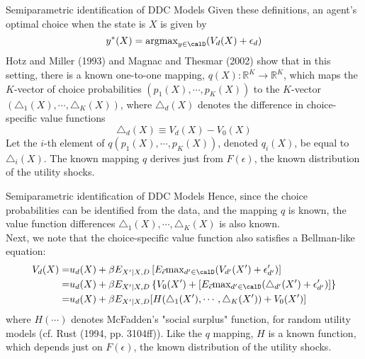 \begin{frame}{Semiparametric identification of DDC Models}
Given these definitions, an agent's optimal choice when the state is $X$ is given by 
\begin{equation*}
y^* (X) = \text{argmax}_{y \in \calD} (V_d(X) + \epsilon_d)
\end{equation*}
Hotz and Miller (1993) and Magnac and Thesmar (2002) show that in this setting, there is a known one-to-one mapping, $q(X) : \mathbb{R}^K \rightarrow \mathbb{R}^K$, which maps the $K$-vector of choice probabilities $(p_1(X), \cdots , p_K(X))$ to the $K$-vector $(\triangle_1(X), \cdots , \triangle_K (X))$, where $\triangle_d(X)$ denotes the difference in choice-specific value functions
\begin{equation*}
\triangle_d(X) \equiv V_d(X) - V_0(X)
\end{equation*}
Let the $i$-th element of $q(p_1(X), \cdots, p_K(X))$, denoted $q_i(X)$, be equal to $\triangle_i(X)$. The known mapping $q$ derives just from $F(\epsilon)$, the known distribution of the utility shocks. \\
\end{frame}

\begin{frame}{Semiparametric identification of DDC Models}
Hence, since the choice probabilities can be identified from the data, and the mapping $q$ is known, the value function differences $\triangle_1(X), \cdots, \triangle_K(X)$ is also known. \\
\vspace{2mm}
Next, we note that the choice-specific value function also satisfies a Bellman-like equation:
\begin{equation}
\begin{split}
V_d(X) = & u_d(X) + \beta E_{X'|X,D} \left [ E_{\vec{\epsilon}} \text{max}_{d' \in \calD} (V_{d'} (X') + \epsilon'_{d'}) \right ] \\
= & u_d(X) + \beta E_{X'|X,D} \left \{ V_0 (X') + \left [ E_{\vec{\epsilon}} \text{max}_{d' \in \calD} (\triangle_{d'} (X') + \epsilon'_{d'}) \right ] \right \} \\
= & u_d(X) + \beta E_{X'|X,D} [ H(\triangle_1 (X'), \cdots, \triangle_K(X')) + V_0(X') ]
\end{split}
\end{equation}
where $H(\cdots)$ denotes McFadden's "social surplus" function, for random utility models (cf. Rust (1994, pp. 3104ff)). Like the $q$ mapping, $H$ is a known function, which depends just on $F(\epsilon)$, the known distribution of the utility shocks. 
\end{frame}

